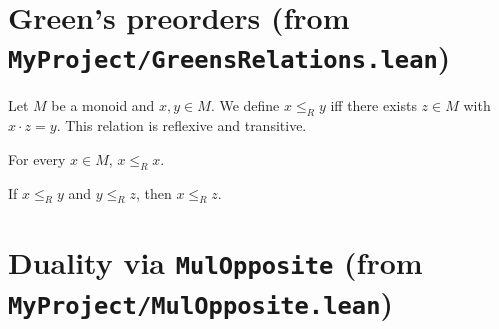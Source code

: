 %



\section{Green's preorders (from \texttt{MyProject/GreensRelations.lean})}

\begin{definition}
\label{def:RRel}
Let \(M\) be a monoid and \(x,y\in M\).
We define \(x \le_R y\) iff there exists \(z\in M\) with \(x\cdot z = y\).
This relation is reflexive and transitive.
\leanok
\end{definition}

\begin{lemma}[Reflexivity of \(\le_R\)]
\label{lem:RRel-refl}
For every \(x\in M\), \(x \le_R x\).
\leanok
{}
\end{lemma}

\begin{lemma}[Transitivity of \(\le_R\)]
\label{lem:RRel-trans}
If \(x \le_R y\) and \(y \le_R z\), then \(x \le_R z\).
\leanok
{}
\end{lemma}


\section{Duality via \texttt{MulOpposite} (from \texttt{MyProject/MulOpposite.lean})}

